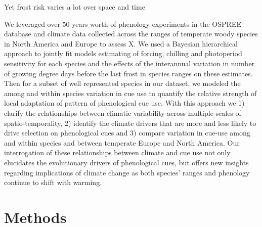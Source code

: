 \documentclass[12pt]{article}
\begin{document}
Yet frost risk varies a lot over space and time



\noindent We leveraged over 50 years worth of phenology experiments in the OSPREE database \citep{wolkovich2019} and climate data collected across the ranges of temperate woody species in North America and Europe to assess X. We used a Bayesian hierarchical approach to jointly fit models estimating of forcing, chilling and photoperiod sensitivity for each species and the effects of the interannual variation in number of growing degree days before the last frost in species ranges on these estimates. Then for a subset of well represented species in our dataset, we modeled the among and within species variation in cue use to quantify the relative strength of local adaptation of pattern of phenological cue use. With this approach we 1) clarify the relationships between climatic variability across multiple scales of spatio-temporality, 2) identify the climate drivers that are more and less likely to drive selection on phenological cues and 3) compare variation in cue-use among and within species and between temperate Europe and North America. Our interrogation of these relationships between climate and cue use not only elucidates the evolutionary drivers of phenological cues, but offers new insights regarding implications of climate change as both species' ranges and phenology continue to shift with warming.


\section*{Methods}
\end{document}
